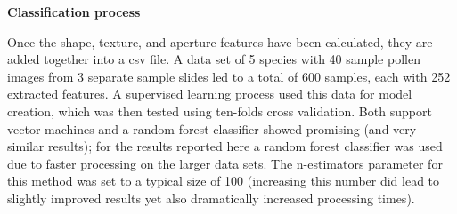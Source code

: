 \textbf{Classification process}

Once the shape, texture, and aperture features have been calculated, they are added together into a csv file. A data set of 5 species with 40 sample pollen images from 3 separate sample slides led to a total of 600 samples, each with 252 extracted features. A supervised learning process used this data for model creation, which was then tested using ten-folds cross validation. Both support vector machines and a random forest classifier showed promising (and very similar results); for the results reported here a random forest classifier was used due to faster processing on the larger data sets. The n-estimators parameter for this method was set to a typical size of 100 (increasing this number did lead to slightly improved results yet also dramatically increased processing times).
    
  